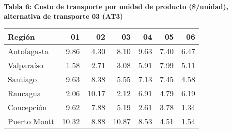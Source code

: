 \documentclass[a4paper]{article}
\begin{document}
        \vspace{0.5cm}
        
        \textbf{Tabla 6: Costo de transporte por unidad de producto (\$/unidad), alternativa de transporte 03 (AT3)}
        \begin{center}
            \begin{tabular}{|l|r|r|r|r|r|r|}
                \hline
                Región & 01 & 02 & 03 & 04 & 05 & 06 \\
                \hline
                Antofagasta  & 9.86 & 4.30 & 8.10  & 9.63 & 7.40 & 6.47  \\
                Valparaíso   & 1.58 & 2.71 & 3.08  & 5.91 & 7.99 & 5.11  \\
                Santiago     & 9.63 & 8.38 & 5.55  & 7.13 & 7.45 & 4.58  \\
                Rancagua     & 2.06 & 10.17 & 2.12 & 6.91 & 4.79 & 6.19  \\
                Concepción   & 9.62 & 7.88 & 5.19  & 2.61 & 3.78 & 1.34  \\
                Puerto Montt & 10.32 & 8.88 & 10.87 & 8.53 & 4.51 & 1.54  \\
                \hline
            \end{tabular}
        \end{center}

            
    \newpage
\end{document}
